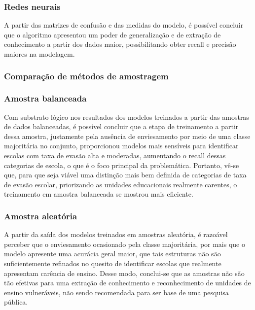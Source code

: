 \subsubsection{Redes neurais}

\par A partir das matrizes de confusão e das medidas do modelo, é possível concluir que o algoritmo apresentou um poder de generalização e de extração de conhecimento a partir dos dados maior, possibilitando obter recall e precisão maiores na modelagem.

\subsubsection{Comparação de métodos de amostragem}

\subsubsection{Amostra balanceada}

\par Com substrato lógico nos resultados dos modelos treinados a partir das amostras de dados balanceadas, é possível concluir que a etapa de treinamento a partir dessa amostra, justamente pela ausência de enviesamento por meio de uma classe majoritária no conjunto, proporcionou modelos mais sensíveis para identificar escolas com taxa de evasão alta e moderadas, aumentando o recall dessas categorias de escola, o que é o foco principal da problemática. Portanto, vê-se que, para que seja viável uma distinção mais bem definida de categorias de taxa de evasão escolar, priorizando as unidades educacionais realmente carentes, o treinamento em amostra balanceada se mostrou mais eficiente.

\subsubsection{Amostra aleatória}

\par A partir da saída dos modelos treinados em amostras aleatória, é razoável perceber que o enviesamento ocasionado pela classe majoritária, por mais que o modelo apresente uma acurácia geral maior, que tais estruturas não são suficientemente refinados no quesito de identificar escolas que realmente apresentam carência de ensino. Desse modo, conclui-se que as amostras não são tão efetivas para uma extração de conhecimento e reconhecimento de unidades de ensino vulneráveis, não sendo recomendada para ser base de uma pesquisa pública.

